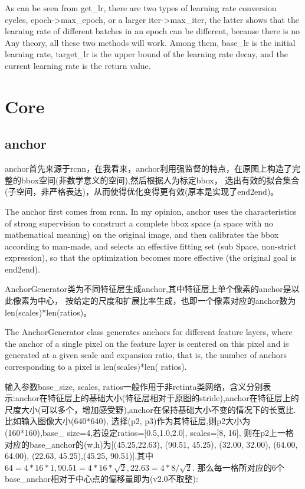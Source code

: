 \documentclass[UTF8]{ctexart}
\begin{document}
As can be seen from get\_lr, there are two types of learning rate conversion 
cycles, epoch->max\_epoch, or a larger iter->max\_iter, the latter shows that 
the learning rate of different batches in an epoch can be different, because 
there is no Any theory, all these two methods will work. Among them, base\_lr 
is the initial learning rate, target\_lr is the upper bound of the learning rate 
decay, and the current learning rate is the return value.


\section{Core}

\subsection{anchor}
\label{core:anchor}
anchor首先来源于rcnn，在我看来，anchor利用强监督的特点，在原图上构造了完整的bbox空间(非数学意义的空间),然后根据人为标定bbox，
选出有效的拟合集合(子空间，非严格表达)，从而使得优化变得更有效(原本是实现了end2end)。

The anchor first comes from rcnn. In my opinion, anchor uses the characteristics of strong supervision 
to construct a complete bbox space (a space with no mathematical meaning) on the original image, and 
then calibrates the bbox according to man-made, and selects an effective fitting set (sub Space, 
non-strict expression), so that the optimization becomes more effective (the original goal is end2end).

AnchorGenerator类为不同特征层生成anchor,其中特征层上单个像素的anchor是以此像素为中心，
按给定的尺度和扩展比率生成，也即一个像素对应的anchor数为len(scales)*len(ratios)。

The AnchorGenerator class generates anchors for different feature layers, where the anchor of a single
 pixel on the feature layer is centered on this pixel and is generated at a given scale and expansion 
 ratio, that is, the number of anchors corresponding to a pixel is len(scales)*len( ratios).

输入参数base\_size, scales, ratios一般作用于非retinta类网络，含义分别表示:anchor在特征层上的基础大小(特征层相对于原图的stride),anchor在特征层上的尺度大小(可以多个，增加感受野),anchor在保持基础大小不变的情况下的长宽比.
比如输入图像大小(640*640), 选择(p2, p3)作为其特征层,则p2大小为(160*160),base\_ size=4,若设定ratios=[0.5,1.0,2.0], scales=[8, 16],
则在p2上一格对应的base\_anchor的(w,h)为[(45.25,22.63),  (90.51, 45.25),
 (32.00, 32.00),  (64.00, 64.00), (22.63, 45.25),(45.25, 90.51)].其中$64=4*16*1,90.51=4*16*\sqrt{2}, 22.63=4*8/\sqrt{2}.$
 那么每一格所对应的6个base\_anchor相对于中心点的偏移量即为(v2.0不取整):
\end{document}
